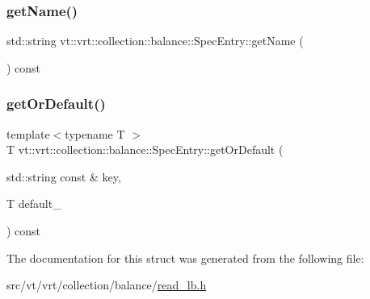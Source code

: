 \subsubsection{\texorpdfstring{get\+Name()}{getName()}}
{\footnotesize\ttfamily std\+::string vt\+::vrt\+::collection\+::balance\+::\+Spec\+Entry\+::get\+Name (\begin{DoxyParamCaption}{ }\end{DoxyParamCaption}) const\hspace{0.3cm}{\ttfamily [inline]}}

\mbox{\label{structvt_1_1vrt_1_1collection_1_1balance_1_1_spec_entry_ae5c35506e15c2123029d071a284b9367}} 
\subsubsection{\texorpdfstring{get\+Or\+Default()}{getOrDefault()}}
{\footnotesize\ttfamily template$<$typename T $>$ \\
T vt\+::vrt\+::collection\+::balance\+::\+Spec\+Entry\+::get\+Or\+Default (\begin{DoxyParamCaption}\item[{std\+::string const \&}]{key,  }\item[{T}]{default\+\_\+ }\end{DoxyParamCaption}) const\hspace{0.3cm}{\ttfamily [inline]}}



The documentation for this struct was generated from the following file\+:\begin{DoxyCompactItemize}
\item 
src/vt/vrt/collection/balance/\hyperlink{read__lb_8h}{read\+\_\+lb.\+h}\end{DoxyCompactItemize}
